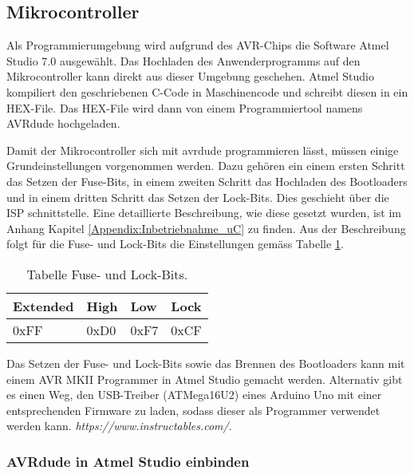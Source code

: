 \subsection{Mikrocontroller}
\label{subsec:Inbetriebnahme_Mikrocontroller}

Als Programmierumgebung wird aufgrund des AVR-Chips die Software Atmel Studio 7.0 ausgewählt. Das Hochladen des Anwenderprogramms auf den Mikrocontroller kann direkt aus dieser Umgebung geschehen. 
Atmel Studio kompiliert den geschriebenen C-Code in Maschinencode und schreibt diesen in ein HEX-File. Das HEX-File wird dann von einem Programmiertool namens AVRdude hochgeladen.\cite{verschiedene_autoren_avrdude_2019}

Damit der Mikrocontroller sich mit avrdude programmieren lässt, müssen einige Grundeinstellungen vorgenommen werden. Dazu gehören ein einem ersten Schritt das Setzen der Fuse-Bits, in einem zweiten Schritt das Hochladen des Bootloaders und in einem dritten Schritt das Setzen der Lock-Bits. Dies geschieht über die ISP schnittstelle. Eine detaillierte Beschreibung, wie diese gesetzt wurden, ist im Anhang Kapitel \ref{Appendix:Inbetriebnahme_uC} zu finden. Aus der Beschreibung folgt für die Fuse- und Lock-Bits die Einstellungen gemäss Tabelle \ref{tab:Fuse_und_Lock-Bits}.

\begin{table}[h!]
\center
\begin{tabular}{|l|l|l|l|}
\hline
\textbf{Extended} & \textbf{High} & \textbf{Low} & \textbf{Lock}\\
\hline
0xFF & 0xD0 & 0xF7 & 0xCF\\
\hline
\end{tabular}
\caption{Tabelle Fuse- und Lock-Bits.}
\label{tab:Fuse_und_Lock-Bits}
\end{table}

Das Setzen der Fuse- und Lock-Bits sowie das Brennen des Bootloaders kann mit einem AVR MKII Programmer in Atmel Studio gemacht werden. Alternativ gibt es einen Weg, den USB-Treiber (ATMega16U2) eines Arduino Uno mit einer entsprechenden Firmware zu laden, sodass dieser als Programmer verwendet werden kann. \textit{https://www.instructables.com/}. \cite{vidmofollow_turn_2017}

\subsubsection{AVRdude in Atmel Studio einbinden}\label{subsubsec:avrdude_in_atmelstudio_einbinden}

